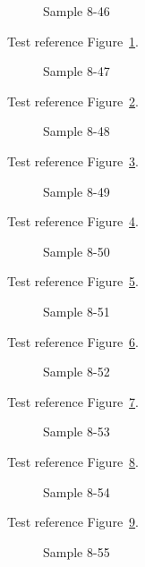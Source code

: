 \begin{figure}[tbhp]
\caption{Sample 8-46}
\label{fig:sample-8-46}
\end{figure}

Test reference Figure~\ref{fig:sample-8-46}.

\begin{figure}[tbhp]
\caption{Sample 8-47}
\label{fig:sample-8-47}
\end{figure}

Test reference Figure~\ref{fig:sample-8-47}.

\begin{figure}[tbhp]
\caption{Sample 8-48}
\label{fig:sample-8-48}
\end{figure}

Test reference Figure~\ref{fig:sample-8-48}.

\begin{figure}[tbhp]
\caption{Sample 8-49}
\label{fig:sample-8-49}
\end{figure}

Test reference Figure~\ref{fig:sample-8-49}.

\begin{figure}[tbhp]
\caption{Sample 8-50}
\label{fig:sample-8-50}
\end{figure}

Test reference Figure~\ref{fig:sample-8-50}.

\begin{figure}[tbhp]
\caption{Sample 8-51}
\label{fig:sample-8-51}
\end{figure}

Test reference Figure~\ref{fig:sample-8-51}.

\begin{figure}[tbhp]
\caption{Sample 8-52}
\label{fig:sample-8-52}
\end{figure}

Test reference Figure~\ref{fig:sample-8-52}.

\begin{figure}[tbhp]
\caption{Sample 8-53}
\label{fig:sample-8-53}
\end{figure}

Test reference Figure~\ref{fig:sample-8-53}.

\begin{figure}[tbhp]
\caption{Sample 8-54}
\label{fig:sample-8-54}
\end{figure}

Test reference Figure~\ref{fig:sample-8-54}.

\begin{figure}[tbhp]
\caption{Sample 8-55}
\label{fig:sample-8-55}
\end{figure}


